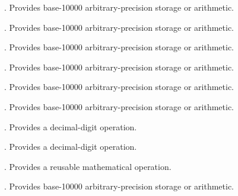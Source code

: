 \begin{description}
\item[\texttt{}] \texttt{}. Provides base-10000 arbitrary-precision storage or arithmetic.
\item[\texttt{}] \texttt{}. Provides base-10000 arbitrary-precision storage or arithmetic.
\item[\texttt{}] \texttt{}. Provides base-10000 arbitrary-precision storage or arithmetic.
\item[\texttt{}] \texttt{}. Provides base-10000 arbitrary-precision storage or arithmetic.
\item[\texttt{}] \texttt{}. Provides base-10000 arbitrary-precision storage or arithmetic.
\item[\texttt{}] \texttt{}. Provides base-10000 arbitrary-precision storage or arithmetic.
\item[\texttt{}] \texttt{}. Provides a decimal-digit operation.
\item[\texttt{}] \texttt{}. Provides a decimal-digit operation.
\item[\texttt{}] \texttt{}. Provides a reusable mathematical operation.
\item[\texttt{}] \texttt{}. Provides base-10000 arbitrary-precision storage or arithmetic.
\end{description}

